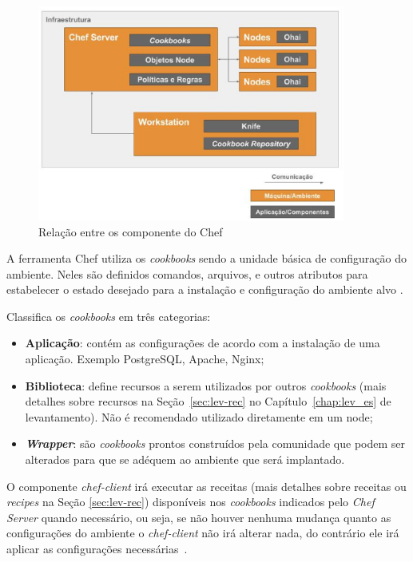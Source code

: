 \begin{figure}[]
  \centering
  \includegraphics[width=0.9\textwidth]{figuras/chef-comp.eps}
  \caption{Relação entre os componente do Chef}
  \label{fig:chef-comp}
\end{figure}

A ferramenta Chef utiliza os \textit{cookbooks} sendo a unidade básica de configuração do
ambiente. Neles são definidos comandos, arquivos, e outros atributos
para estabelecer o estado desejado para a instalação e configuração
do ambiente alvo \cite{sharma:2015}.

 Classifica os \textit{cookbooks} em três categorias:
\begin{itemize}
  \item \textbf{Aplicação}: contém as configurações de acordo com a instalação de
    uma aplicação. Exemplo PostgreSQL, Apache, Nginx;
  \item \textbf{Biblioteca}: define recursos a serem utilizados por outros \textit{cookbooks}
    (mais detalhes sobre recursos na Seção~\ref{sec:lev-rec} no Capítulo~\ref{chap:lev_es} de levantamento).
    Não é recomendado utilizado diretamente em um node;
  \item \textbf{\textit{Wrapper}}: são \textit{cookbooks} prontos construídos pela comunidade que podem
    ser alterados para que se adéquem ao ambiente que será implantado.
\end{itemize}

O componente \textit{chef-client} irá executar as receitas (mais detalhes sobre receitas ou
\textit{recipes} na Seção \ref{sec:lev-rec}) disponíveis nos \textit{cookbooks}
indicados pelo \textit{Chef Server} quando necessário, ou seja, se não houver
nenhuma mudança quanto as configurações do ambiente o \textit{chef-client} não irá
alterar nada, do contrário ele irá aplicar as configurações necessárias~\cite{chefdoc:2016}.




